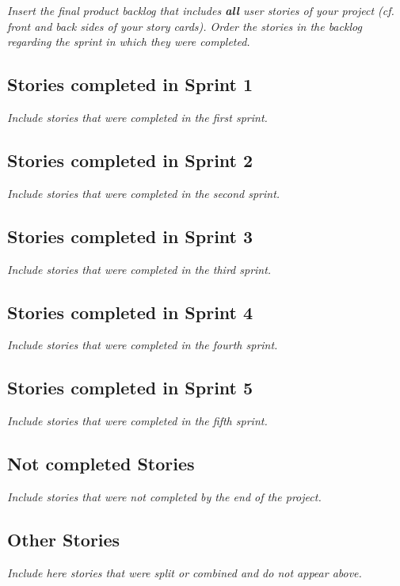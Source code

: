 \emph{Insert the final product backlog that includes \textbf{all} user stories 
of your project (cf. front and back sides of your story cards). Order the 
stories in the backlog regarding the sprint in which they were completed.}

\subsection*{Stories completed in Sprint 1}

\emph{Include stories that were completed in the first sprint.}

\subsection*{Stories completed in Sprint 2}
\emph{Include stories that were completed in the second sprint.}

\subsection*{Stories completed in Sprint 3}
\emph{Include stories that were completed in the third sprint.}

\subsection*{Stories completed in Sprint 4}
\emph{Include stories that were completed in the fourth sprint.}

\subsection*{Stories completed in Sprint 5}
\emph{Include stories that were completed in the fifth sprint.}

\subsection*{Not completed Stories}
\emph{Include stories that were not completed by the end of the project.}

\subsection*{Other Stories}
\emph{Include here stories that were split or combined and do not appear above.}
